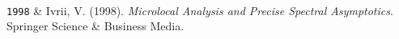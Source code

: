 \documentclass[9pt,a4paper]{article}
\newcommand{\Year}[1]{\fontsize{10pt}{0}\selectfont \texttt{#1}}
\newcommand{\Website}[1]{\href{https://#1}{#1}}
\begin{document}
\begin{EntriesTableYear}
  \\ %
  \Year{1998} & Ivrii, V. (1998).  \textit{Microlocal Analysis and
    Precise Spectral Asymptotics}.  Springer Science \& Business
  Media. %
\end{EntriesTableYear}
\end{document}
